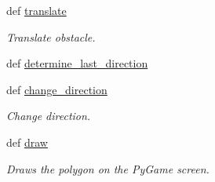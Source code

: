 \begin{DoxyCompactItemize}
def \hyperlink{classobstacle_1_1PolyObstacle_a8d4b0d3a614af138881a2f93d93f028a}{translate}
\begin{DoxyCompactList}\small\item\em Translate obstacle. \end{DoxyCompactList}\item 
def \hyperlink{classobstacle_1_1PolyObstacle_a64c90b17b8ca249e30e0b040930798de}{determine\-\_\-last\-\_\-direction}
\item 
def \hyperlink{classobstacle_1_1PolyObstacle_a9b6945bd67258643ad471c965889d707}{change\-\_\-direction}
\begin{DoxyCompactList}\small\item\em Change direction. \end{DoxyCompactList}\item 
def \hyperlink{classobstacle_1_1PolyObstacle_a9b5b53a6b8ee6233de2ee394871ebe6e}{draw}
\begin{DoxyCompactList}\small\item\em Draws the polygon on the Py\-Game screen. \end{DoxyCompactList}\end{DoxyCompactItemize}
